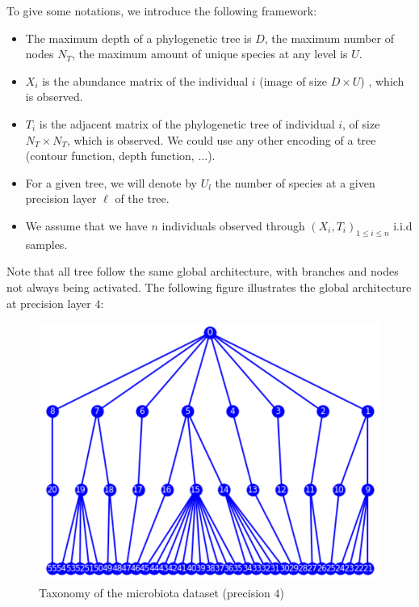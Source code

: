 To give some notations, we introduce the following framework:
\begin{itemize}
    \item The maximum depth of a phylogenetic tree is $D$, the maximum number of nodes $N_T$, the maximum amount of unique species at any level is $U$.
    \item $X_i$ is the abundance matrix of the individual $i$ (image of size $D \times U$) , which is observed.
    \item $T_i$ is the adjacent matrix of the phylogenetic tree of individual $i$, of size $N_T \times N_T$, which is observed.
    We could use any other encoding of a tree (contour function, depth function, $\dots$).
    \item For a given tree, we will denote by $U_{l}$ the number of species at a given precision layer $\ell$ of the tree.
    \item We assume that we have $n$ individuals observed through $(X_i, T_i)_{1 \leq i \leq n}$ i.i.d samples.
\end{itemize}

Note that all tree follow the same global architecture, with branches and nodes not always being activated.
The following figure illustrates the global architecture at precision layer $4$:
\begin{figure}[H]
    \centering
    \includegraphics[scale=.6]{images/microbiota_tree_global_structure}
    \caption{Taxonomy of the microbiota dataset (precision $4$)}
    \label{fig:taxonomy_microbiota_p4}
\end{figure}

